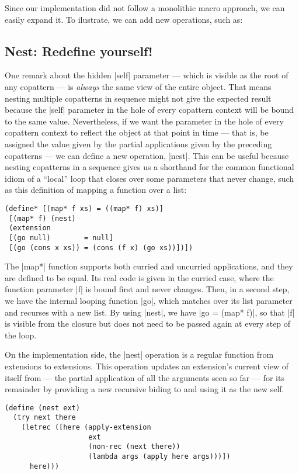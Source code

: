 Since our implementation did not follow a monolithic macro approach, we can easily expand it.
To ilustrate, we can add new operations, such as:

\subsection{Nest: Redefine yourself!}
One remark about the hidden \scm|self| parameter --- which is visible as the root of any copattern --- is \emph{always} the same view of the entire object.
That means nesting multiple copatterns in sequence might not give the expected result because the \scm|self| parameter in the hole of every copattern context will be bound to the same value.
Nevertheless, if we want the parameter in the hole of every copattern context to reflect the object at that point in time --- that is, be assigned the value given by the partial applications given by the preceding copatterns --- we can define a new operation, \scm|nest|.
This can be useful because nesting copatterns in a sequence gives us a shorthand for the common functional idiom of a ``local'' loop that closes over some parameters that never change, such as this definition of mapping a function over a list:
\begin{verbatim}
(define* [(map* f xs) = ((map* f) xs)]
 [(map* f) (nest)
 (extension
 [(go null)        = null]
 [(go (cons x xs)) = (cons (f x) (go xs))])])
\end{verbatim}
The \scm|map*| function supports both curried and uncurried applications, and they are defined to be equal.
Its real code is given in the curried case, where the function parameter \scm|f| is bound first and never changes.
Then, in a second step, we have the internal looping function \scm|go|, which matches over its list parameter and recurses with a new list.
By using \scm|nest|, we have \scm|go = (map* f)|, so that \scm|f| is visible from the closure but does not need to be passed again at every step of the loop.

On the implementation side, the \scm|nest| operation is a regular function from extensions to extensions.
This operation updates an extension's current view of itself from  --- the partial application of all the arguments seen so far --- for its remainder by providing a new recursive biding to  and using it as the new self.
\begin{verbatim}
(define (nest ext)
  (try next there
    (letrec ([here (apply-extension
                    ext
                    (non-rec (next there))
                    (lambda args (apply here args)))])
      here)))
\end{verbatim}

